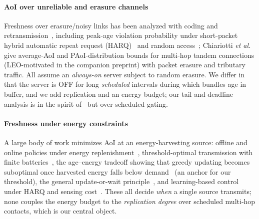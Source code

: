 \documentclass[twocolumn,3p,times,procedia]{elsarticle}
\theoremstyle{plain}
\theoremstyle{remark}
\begin{document}
\paragraph*{AoI over unreliable and erasure channels}
Freshness over erasure/noisy links has been analyzed with coding and
retransmission~\cite{parag2017,najm2019}, including peak-age violation
probability under short-packet hybrid automatic repeat request
(HARQ)~\cite{devassy2019} and random
access~\cite{chen2022}; Chiariotti \emph{et al.}~\cite{chiariotti} give
average-AoI and PAoI-distribution bounds for multi-hop tandem
connections (LEO-motivated in the companion preprint) with packet
erasure and tributary traffic. All assume an \emph{always-on} server subject to random
erasure. We differ in that the server is OFF for long \emph{scheduled}
intervals during which bundles age in buffer, and we add replication and
an energy budget; our tail and deadline analysis is in the spirit
of~\cite{devassy2019} but over scheduled gating.

\paragraph*{Freshness under energy constraints}
A large body of work minimizes AoI at an energy-harvesting source: offline
and online policies under energy replenishment~\cite{bacinoglu2015,wu2018},
threshold-optimal transmission with finite batteries~\cite{arafa2020}, the
age--energy tradeoff showing that greedy updating becomes suboptimal once
harvested energy falls below demand~\cite{bacinoglu2018} (an anchor for our
threshold), the general update-or-wait principle~\cite{sun2017}, and
learning-based control under HARQ and sensing cost~\cite{ceran2019}.
These all decide \emph{when} a single source transmits; none couples the energy
budget to the \emph{replication degree} over scheduled multi-hop contacts,
which is our central object.
\end{document}
